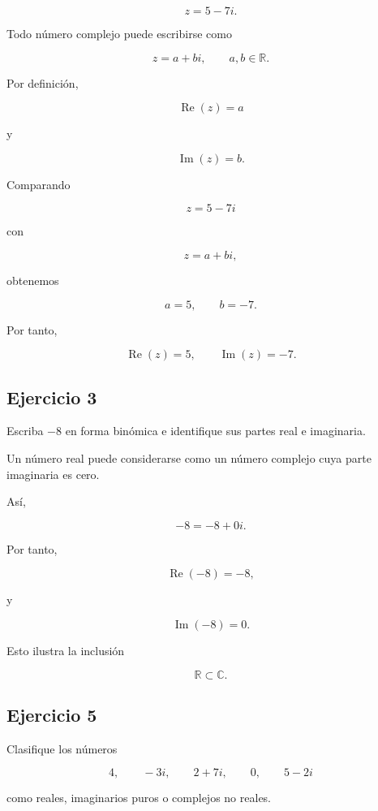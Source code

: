 \documentclass[12pt]{article}
\begin{document}
\[
z=5-7i.
\]

Todo número complejo puede escribirse como

\[
z=a+bi,
\qquad a,b\in\mathbb{R}.
\]

Por definición,

\[
\operatorname{Re}(z)=a
\]

y

\[
\operatorname{Im}(z)=b.
\]

Comparando

\[
z=5-7i
\]

con

\[
z=a+bi,
\]

obtenemos

\[
a=5,
\qquad
b=-7.
\]

Por tanto,

\[
\boxed{\operatorname{Re}(z)=5},
\qquad
\boxed{\operatorname{Im}(z)=-7}.
\]


\subsection*{Ejercicio 3}

Escriba \(-8\) en forma binómica e identifique sus partes real e
imaginaria.

Un número real puede considerarse como un número complejo cuya parte
imaginaria es cero.

Así,

\[
-8=-8+0i.
\]

Por tanto,

\[
\boxed{\operatorname{Re}(-8)=-8},
\]

y

\[
\boxed{\operatorname{Im}(-8)=0}.
\]

Esto ilustra la inclusión

\[
\mathbb{R}\subset\mathbb{C}.
\]


\subsection*{Ejercicio 5}

Clasifique los números

\[
4,\qquad -3i,\qquad 2+7i,\qquad 0,\qquad 5-2i
\]

como reales, imaginarios puros o complejos no reales.
\end{document}
